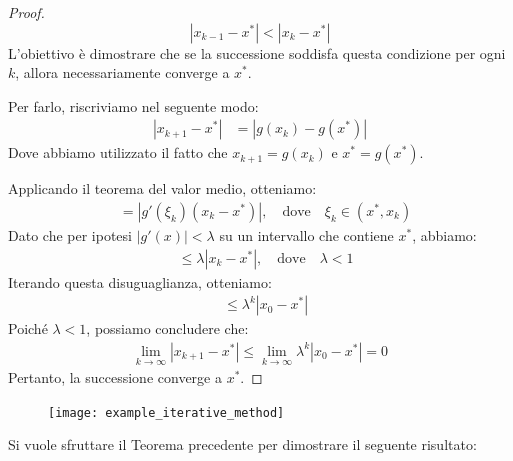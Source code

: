 \documentclass{article}
\begin{document}
\begin{proof}\leavevmode\
    $$\left\lvert x_{k-1}-x^*\right\rvert<\left\lvert x_k-x^*\right\rvert$$
    L'obiettivo è dimostrare che se la successione soddisfa questa
    condizione per ogni $k$, allora necessariamente converge a $x^*$.

    Per farlo, riscriviamo nel seguente modo:
    \[
    \begin{aligned}
        \left\lvert x_{k+1}-x^*\right\rvert &= \left\lvert g(x_k) - g(x^*) \right\rvert
    \end{aligned}
    \]
    Dove abbiamo utilizzato il fatto che $x_{k+1} = g(x_k)$ e $x^* = g(x^*)$.

    Applicando il teorema del valor medio, otteniamo:
    \[
    \begin{aligned}
        &= \left\lvert g'(\xi_k)(x_k-x^*) \right\rvert, \quad \text{dove} \quad \xi_k \in (x^*, x_k)
    \end{aligned}
    \]
    Dato che per ipotesi $|g'(x)| < \lambda$ su un intervallo che contiene
    $x^*$, abbiamo:
    \[
    \begin{aligned}
        &\leq \lambda \left\lvert x_k - x^* \right\rvert, \quad \text{dove} \quad \lambda < 1
    \end{aligned}
    \]
    Iterando questa disuguaglianza, otteniamo:
    \[
    \begin{aligned}
        &\leq \lambda^{k} \left\lvert x_0 - x^* \right\rvert
    \end{aligned}
    \]
    Poiché $\lambda < 1$, possiamo concludere che:
    \[
    \begin{aligned}
        \lim_{k \to \infty} \left\lvert x_{k+1} - x^* \right\rvert \leq \lim_{k \to \infty} \lambda^{k} \left\lvert x_0 - x^* \right\rvert = 0
    \end{aligned}
    \]
    Pertanto, la successione converge a $x^*$.
\end{proof}

\begin{figure}[ht]
   \centering
   \texttt{[image: example\_iterative\_method]}
\end{figure}

Si vuole sfruttare il Teorema precedente per dimostrare il seguente risultato:
\end{document}
